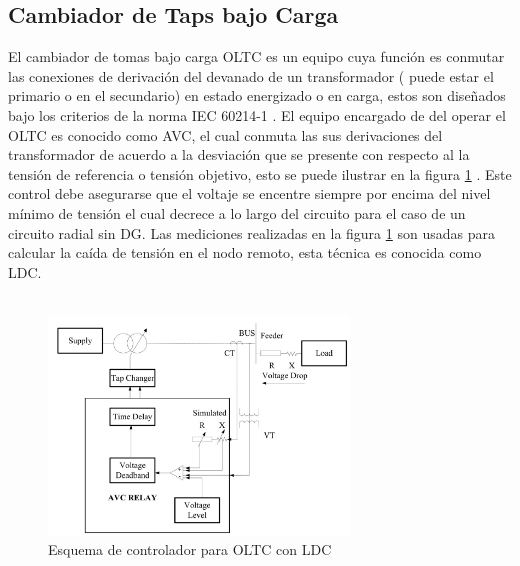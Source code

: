 \documentclass[12pt, letterpaper]{report}
\begin{document}
 \subsection{Cambiador de Taps bajo Carga}
El cambiador de tomas bajo carga \ac{OLTC} es un equipo  cuya función es conmutar las conexiones de derivación del devanado de un transformador ( puede estar el primario o en el secundario) en estado energizado o en carga, estos son diseñados bajo los criterios de la norma IEC 60214-1 \cite{IEC60214}.
El equipo encargado de del operar el \ac{OLTC} es conocido como \ac{AVC}, el cual conmuta las sus derivaciones del transformador de acuerdo a la desviación que se presente con respecto al la tensión de referencia o tensión objetivo, esto se puede ilustrar en la figura \ref{fig:esqusema_LDC} \cite{Sarimuthu2016}. Este control debe asegurarse que el voltaje se encentre siempre por encima del nivel mínimo de tensión el cual decrece a lo largo del circuito \cite{Sarimuthu2016} para el caso de un circuito radial sin DG. Las  mediciones realizadas en la figura \ref{fig:esqusema_LDC} son usadas para calcular la caída de tensión en el nodo remoto, esta técnica es conocida como \ac{LDC}.\\\\

\begin{figure}
\centering
\caption{Esquema de controlador para OLTC con LDC \cite{Sarimuthu2016}}
\label{fig:esqusema_LDC}
\includegraphics[width=8cm]{imagenes/cap_2/LDC}
\end{figure}
\end{document}
